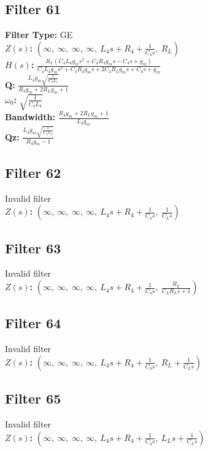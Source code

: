 \documentclass{article}
\begin{document}
\subsection*{Filter 61}
\textbf{Filter Type:} GE \\ 
\textbf{$Z(s)$:} $\left( \infty, \  \infty, \  \infty, \  \infty, \  L_{4} s + R_{4} + \frac{1}{C_{4} s}, \  R_{L}\right)$ \\ 
\textbf{$H(s)$:} $\frac{R_{L} \left(C_{4} L_{4} g_{m} s^{2} + C_{4} R_{4} g_{m} s - C_{4} s + g_{m}\right)}{C_{4} L_{4} g_{m} s^{2} + C_{4} R_{4} g_{m} s + 2 C_{4} R_{L} g_{m} s + C_{4} s + g_{m}}$ \\ 
\textbf{Q:} $\frac{L_{4} g_{m} \sqrt{\frac{1}{C_{4} L_{4}}}}{R_{4} g_{m} + 2 R_{L} g_{m} + 1}$ \\ 
\textbf{$\omega_0$:} $\sqrt{\frac{1}{C_{4} L_{4}}}$ \\ 
\textbf{Bandwidth:} $\frac{R_{4} g_{m} + 2 R_{L} g_{m} + 1}{L_{4} g_{m}}$ \\ 
\textbf{Qz:} $\frac{L_{4} g_{m} \sqrt{\frac{1}{C_{4} L_{4}}}}{R_{4} g_{m} - 1}$ \\ 
\subsection*{Filter 62}
Invalid filter \\ 
\textbf{$Z(s)$:} $\left( \infty, \  \infty, \  \infty, \  \infty, \  L_{4} s + R_{4} + \frac{1}{C_{4} s}, \  \frac{1}{C_{L} s}\right)$ \\ 
\subsection*{Filter 63}
Invalid filter \\ 
\textbf{$Z(s)$:} $\left( \infty, \  \infty, \  \infty, \  \infty, \  L_{4} s + R_{4} + \frac{1}{C_{4} s}, \  \frac{R_{L}}{C_{L} R_{L} s + 1}\right)$ \\ 
\subsection*{Filter 64}
Invalid filter \\ 
\textbf{$Z(s)$:} $\left( \infty, \  \infty, \  \infty, \  \infty, \  L_{4} s + R_{4} + \frac{1}{C_{4} s}, \  R_{L} + \frac{1}{C_{L} s}\right)$ \\ 
\subsection*{Filter 65}
Invalid filter \\ 
\textbf{$Z(s)$:} $\left( \infty, \  \infty, \  \infty, \  \infty, \  L_{4} s + R_{4} + \frac{1}{C_{4} s}, \  L_{L} s + \frac{1}{C_{L} s}\right)$ \\ 
\end{document}
